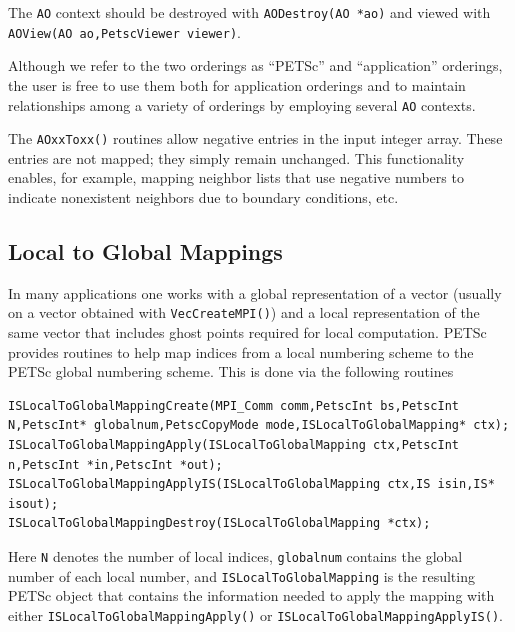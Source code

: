 The \lstinline{AO} context should be destroyed with \lstinline{AODestroy(AO *ao)}
and viewed with \break\lstinline{AOView(AO ao,PetscViewer viewer)}.

Although we refer to the two orderings as ``PETSc'' and
``application'' orderings, the user is free to use them both for
application orderings and to maintain relationships among a variety of
orderings by employing several \lstinline{AO} contexts.

The \lstinline{AOxxToxx()} routines allow negative entries in the input
integer array. These entries are not mapped; they simply remain
unchanged.  This functionality enables, for example, mapping neighbor
lists that use negative numbers to indicate nonexistent neighbors due
to boundary conditions, etc.

\subsection{Local to Global Mappings}
\label{sec_islocaltoglobalmapping}

In many applications one works with a global representation of a vector
(usually on a vector obtained with \lstinline{VecCreateMPI()})
and a local representation of the same vector that includes ghost points
required for local computation.  
 
PETSc provides routines to help map indices from a local numbering scheme to
the PETSc global numbering scheme. This is done via the following routines
\begin{lstlisting}
ISLocalToGlobalMappingCreate(MPI_Comm comm,PetscInt bs,PetscInt N,PetscInt* globalnum,PetscCopyMode mode,ISLocalToGlobalMapping* ctx);
ISLocalToGlobalMappingApply(ISLocalToGlobalMapping ctx,PetscInt n,PetscInt *in,PetscInt *out);
ISLocalToGlobalMappingApplyIS(ISLocalToGlobalMapping ctx,IS isin,IS* isout);
ISLocalToGlobalMappingDestroy(ISLocalToGlobalMapping *ctx);
\end{lstlisting}
Here \lstinline{N} denotes the number of local indices, \lstinline{globalnum} contains the
global number of each local number, and \lstinline{ISLocalToGlobalMapping} is the
resulting PETSc object that contains the information needed to apply the mapping with
either \lstinline{ISLocalToGlobalMappingApply()} or
\break\lstinline{ISLocalToGlobalMappingApplyIS()}.

